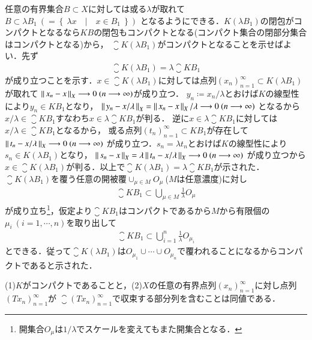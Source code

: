 	\begin{prf}
		任意の有界集合$B \subset X$に対しては或る$\lambda$が取れて$B \subset \lambda B_1\ (= \left\{\ \lambda x\quad |\quad x \in B_1\ \right\})$
		となるようにできる．$K(\lambda B_1)$の閉包がコンパクトとなるなら$KB$の閉包もコンパクトとなる(コンパクト集合の閉部分集合はコンパクトとなる)から，
		$\closure{K(\lambda B_1)}$がコンパクトとなることを示せばよい．先ず
		\begin{align}
			\closure{K(\lambda B_1)} = \lambda \closure{KB_1}
		\end{align}
		が成り立つことを示す．$x \in \closure{K(\lambda B_1)}$に対しては点列$(x_n)_{n=1}^{\infty} \subset K(\lambda B_1)$が取れて
		$\left\|\, x_n - x\, \right\|_{X} \longrightarrow 0\ (n \longrightarrow \infty)$が成り立つ．
		$y_n \coloneqq x_n/\lambda$とおけば$K$の線型性により$y_n \in KB_1$となり，
		$\left\|\, y_n - x/\lambda\, \right\|_{X}= \left\|\, x_n - x\, \right\|_{X}/\lambda \longrightarrow 0\ (n \longrightarrow \infty)$
		となるから$x/\lambda \in \closure{KB_1}$すなわち$x \in \lambda\closure{KB_1}$が判る．
		逆に$x \in \lambda \closure{KB_1}$に対しては$x/\lambda \in \closure{KB_1}$となるから，
		或る点列$(t_n)_{n=1}^{\infty} \subset KB_1$が存在して$\left\|\, t_n - x/\lambda\, \right\|_{X} \longrightarrow 0\ (n \longrightarrow \infty)$
		が成り立つ．$s_n = \lambda t_n$とおけば$K$の線型性により$s_n \in K(\lambda B_1)$となり，
		$\left\|\, s_n - x\, \right\|_{X}= \lambda \left\|\, t_n - x/\lambda\, \right\|_{X} \longrightarrow 0\ (n \longrightarrow \infty)$
		が成り立つから$x \in \closure{K(\lambda B_1)}$が判る．以上で$\closure{K(\lambda B_1)} = \lambda \closure{KB_1}$が示された．
		$\closure{K(\lambda B_1)}$を覆う任意の開被覆$\cup_{\mu \in M}O_\mu\ $($M$は任意濃度)に対し
		\begin{align}
			\closure{KB_1} \subset \bigcup_{\mu \in M} \tfrac{1}{\lambda}O_\mu
		\end{align}
		が成り立ち\footnote{開集合$O_\mu$は$1/\lambda$でスケールを変えてもまた開集合となる．}，仮定より$\closure{KB_1}$はコンパクトであるから$M$から有限個の$\mu_i\ (i=1,\cdots,n)$を取り出して
		\begin{align}
			\closure{KB_1} \subset \bigcup_{i=1}^{n} \tfrac{1}{\lambda}O_{\mu_i}
		\end{align}
		とできる．従って$\closure{K(\lambda B_1)}$は$O_{\mu_1}\cup \cdots \cup O_{\mu_n}$で覆われることになるからコンパクトであると示された．
		\QED
	\end{prf}
	
	\begin{itembox}[l]{}
		\begin{lem}[コンパクト作用素であることの同値条件]
			(1)$K$がコンパクトであることと，(2)$X$の任意の有界点列$(x_n)_{n=1}^{\infty}$に対し点列$(Tx_n)_{n=1}^{\infty}$が
				$\closure{(Tx_n)_{n=1}^{\infty}}$で収束する部分列を含むことは同値である．
		\end{lem}
	\end{itembox}
	
